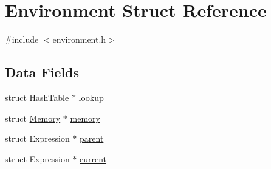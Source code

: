 \hypertarget{structEnvironment}{\section{Environment Struct Reference}
\label{structEnvironment}
}


{\ttfamily \#include $<$environment.\+h$>$}

\subsection*{Data Fields}
\begin{DoxyCompactItemize}
\item 
struct \hyperlink{structHashTable}{Hash\+Table} $\ast$ \hyperlink{structEnvironment_a07eb64196282faa20d47b862cb399cb5}{lookup}
\item 
struct \hyperlink{structMemory}{Memory} $\ast$ \hyperlink{structEnvironment_ac70275bcb0fb6e57a0f12487fff2211b}{memory}
\item 
struct Expression $\ast$ \hyperlink{structEnvironment_a95bad62545979a85c3f7c22d18d6cb6d}{parent}
\item 
struct Expression $\ast$ \hyperlink{structEnvironment_a34909dda403dd6cec46f0f677fd33622}{current}
\end{DoxyCompactItemize}


